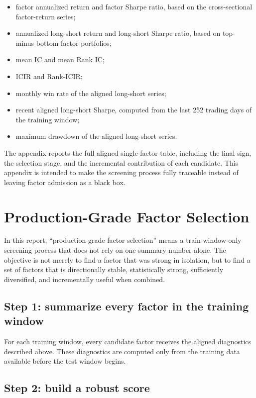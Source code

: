 \documentclass[11pt]{article}
\begin{document}
\begin{itemize}
    \item factor annualized return and factor Sharpe ratio, based on the cross-sectional factor-return series;
    \item annualized long-short return and long-short Sharpe ratio, based on top-minus-bottom factor portfolios;
    \item mean IC and mean Rank IC;
    \item ICIR and Rank-ICIR;
    \item monthly win rate of the aligned long-short series;
    \item recent aligned long-short Sharpe, computed from the last 252 trading days of the training window;
    \item maximum drawdown of the aligned long-short series.
\end{itemize}

The appendix reports the full aligned single-factor table, including the final sign, the selection stage, and the incremental contribution of each candidate. This appendix is intended to make the screening process fully traceable instead of leaving factor admission as a black box.

\section{Production-Grade Factor Selection}

In this report, ``production-grade factor selection'' means a train-window-only screening process that does not rely on one summary number alone. The objective is not merely to find a factor that was strong in isolation, but to find a set of factors that is directionally stable, statistically strong, sufficiently diversified, and incrementally useful when combined.

\subsection{Step 1: summarize every factor in the training window}

For each training window, every candidate factor receives the aligned diagnostics described above. These diagnostics are computed only from the training data available before the test window begins.

\subsection{Step 2: build a robust score}
\end{document}

